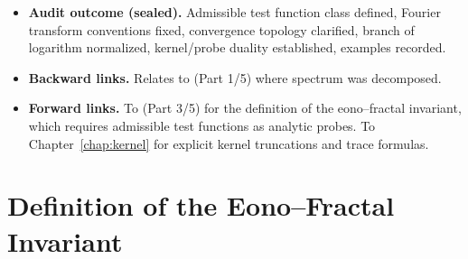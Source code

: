 \begin{itemize}
  \item \textbf{Audit outcome (sealed).}
        Admissible test function class defined, Fourier transform conventions fixed, convergence topology clarified,
        branch of logarithm normalized, kernel/probe duality established, examples recorded.
  \item \textbf{Backward links.}
        Relates to  (Part 1/5) where spectrum was decomposed.
  \item \textbf{Forward links.}
        To  (Part 3/5) for the definition of the eono–fractal invariant, which requires admissible test functions as analytic probes.
        To Chapter~\ref{chap:kernel} for explicit kernel truncations and trace formulas.
\end{itemize}



\section{Definition of the Eono–Fractal Invariant}
\label{sec:def-invariant}

